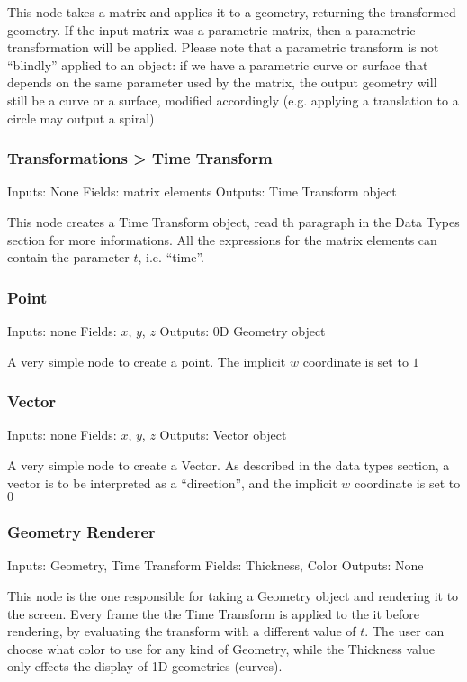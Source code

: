 This node takes a matrix and applies it to a geometry, returning the transformed geometry.
If the input matrix was a parametric matrix, then a parametric transformation will be applied.
Please note that a parametric transform is not ``blindly'' applied to an object: if we have
a parametric curve or surface that depends on the same parameter used by the matrix,
the output geometry will still be a curve or a surface, modified accordingly
(e.g. applying a translation to a circle may output a spiral)

\subsubsection{Transformations > Time Transform}
Inputs: None
Fields: matrix elements
Outputs: Time Transform object

This node creates a Time Transform object, read th paragraph in the Data Types
section for more informations. All the expressions for the matrix elements
can contain the parameter $t$, i.e. ``time''.

\subsubsection{Point}
Inputs: none
Fields: $x$, $y$, $z$
Outputs: 0D Geometry object

A very simple node to create a point. The implicit $w$ coordinate is set to $1$

\subsubsection{Vector}
Inputs: none
Fields: $x$, $y$, $z$
Outputs: Vector object

A very simple node to create a Vector. As described in the data types section, a vector
is to be interpreted as a ``direction'', and the implicit $w$ coordinate is set to $0$

\subsubsection{Geometry Renderer}
Inputs: Geometry, Time Transform
Fields: Thickness, Color
Outputs: None

This node is the one responsible for taking a Geometry object and rendering it to the screen.
Every frame the the Time Transform is applied to the it before rendering, by evaluating the
transform with a different value of $t$. The user can choose what color to use for any kind
of Geometry, while the Thickness value only effects the display of 1D geometries (curves).

